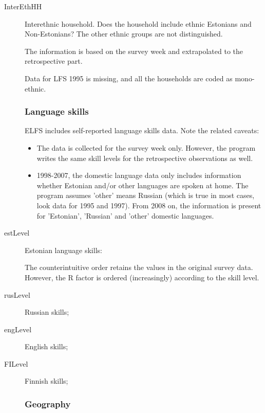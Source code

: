 \documentclass[a4paper]{article}
\newcommand{\R}{\textsf{R}\xspace}
\begin{document}
\begin{description}
\item[InterEthHH] Interethnic household.  Does the household include
  ethnic Estonians and Non-Estonians?  The other ethnic groups are not
  distinguished. 

  The information is based on the survey week and extrapolated to the
  retrospective part.  

  Data for LFS 1995 is missing, and all the households are coded as
  mono-ethnic.  


  \subsubsection{Language skills}
  \label{sec:language}

  ELFS includes self-reported language skills data.  Note the related
  caveats: 
  \begin{itemize}
  \item The data is collected for the survey week only.  However, the
    program writes the same skill levels for the retrospective
    observations as well.
  \item 1998-2007, the domestic language data only includes
    information whether Estonian and/or other languages are spoken at
    home.  The program assumes 'other' means Russian (which is true in
    most cases, look data for 1995 and 1997).  From 2008 on, the
    information is present for 'Estonian', 'Russian' and 'other'
    domestic languages.
  \end{itemize}

\item[estLevel] Estonian language skills:
  The counterintuitive order retains the values in the original survey
  data.  However, the \R factor is ordered (increasingly) according to
  the skill level.
\item[rusLevel] Russian skills;
\item[engLevel] English skills;
\item[FILevel] Finnish skills;

  \subsubsection{Geography}
  \label{sec:geography}


\end{description}
\end{document}
